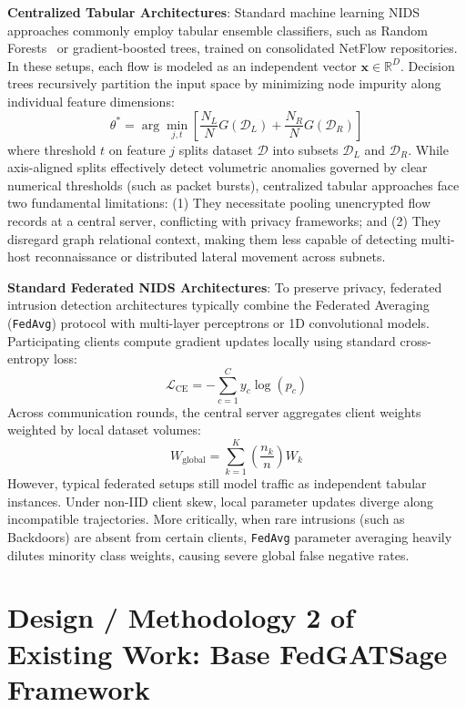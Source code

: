 \documentclass[12pt,a4paper]{report}
\begin{document}
\textbf{Centralized Tabular Architectures}: Standard machine learning NIDS approaches commonly employ tabular ensemble classifiers, such as Random Forests~\cite{breiman2001randomforests} or gradient-boosted trees, trained on consolidated NetFlow repositories. In these setups, each flow is modeled as an independent vector $\boldsymbol{x} \in \mathbb{R}^D$. Decision trees recursively partition the input space by minimizing node impurity along individual feature dimensions:
\begin{equation}
\theta^* = \arg\min_{j, t} \left[ \frac{N_L}{N} G(\mathcal{D}_L) + \frac{N_R}{N} G(\mathcal{D}_R) \right]
\end{equation}
where threshold $t$ on feature $j$ splits dataset $\mathcal{D}$ into subsets $\mathcal{D}_L$ and $\mathcal{D}_R$. While axis-aligned splits effectively detect volumetric anomalies governed by clear numerical thresholds (such as packet bursts), centralized tabular approaches face two fundamental limitations: (1) They necessitate pooling unencrypted flow records at a central server, conflicting with privacy frameworks; and (2) They disregard graph relational context, making them less capable of detecting multi-host reconnaissance or distributed lateral movement across subnets.

\textbf{Standard Federated NIDS Architectures}: To preserve privacy, federated intrusion detection architectures typically combine the Federated Averaging (\texttt{FedAvg}) protocol with multi-layer perceptrons or 1D convolutional models. Participating clients compute gradient updates locally using standard cross-entropy loss:
\begin{equation}
\mathcal{L}_{\text{CE}} = - \sum_{c=1}^C y_c \log(p_c)
\end{equation}
Across communication rounds, the central server aggregates client weights weighted by local dataset volumes:
\begin{equation}
W_{\text{global}} = \sum_{k=1}^K \left( \frac{n_k}{n} \right) W_k
\end{equation}
However, typical federated setups still model traffic as independent tabular instances. Under non-IID client skew, local parameter updates diverge along incompatible trajectories. More critically, when rare intrusions (such as Backdoors) are absent from certain clients, \texttt{FedAvg} parameter averaging heavily dilutes minority class weights, causing severe global false negative rates.

\section{Design / Methodology 2 of Existing Work: Base FedGATSage Framework}\label{sec:existing2}
\label{sec:methodology2}
\end{document}
